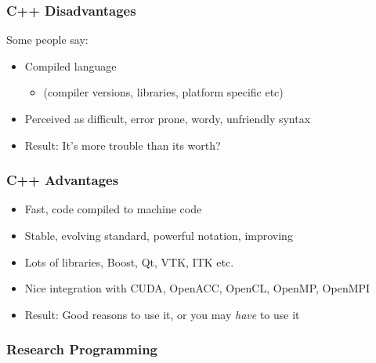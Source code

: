 \subsubsection{C++ Disadvantages}\label{c-disadvantages}

Some people say:

\begin{itemize}
\itemsep1pt\parskip0pt
\item
  Compiled language

  \begin{itemize}
  \itemsep1pt\parskip0pt
  \item
    (compiler versions, libraries, platform specific etc)
  \end{itemize}
\item
  Perceived as difficult, error prone, wordy, unfriendly syntax
\item
  Result: It's more trouble than its worth?
\end{itemize}

\subsubsection{C++ Advantages}\label{c-advantages}

\begin{itemize}
\itemsep1pt\parskip0pt
\item
  Fast, code compiled to machine code
\item
  Stable, evolving standard, powerful notation, improving
\item
  Lots of libraries, Boost, Qt, VTK, ITK etc.
\item
  Nice integration with CUDA, OpenACC, OpenCL, OpenMP, OpenMPI
\item
  Result: Good reasons to use it, or you may \emph{have} to use it
\end{itemize}

\subsubsection{Research Programming}\label{research-programming}

